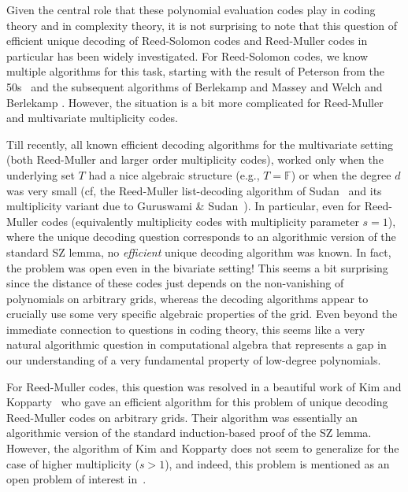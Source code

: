 \documentclass{article}
\def\Field{\mathbb{F}}
\let\F\Field
\begin{document}
	Given the central role that these polynomial evaluation codes play in
	coding theory and in complexity theory, it is not surprising to note
	that this question of efficient unique decoding of Reed-Solomon codes
	and Reed-Muller codes in particular has been widely investigated. For
	Reed-Solomon codes, we know multiple algorithms for this task,
	starting with the result of Peterson from the 50s~\cite{Peterson1960}
	and the subsequent algorithms of Berlekamp and Massey
	\cite{Berlekamp,Massey1969} and Welch and Berlekamp
	\cite{WelchB1986}. However, the situation is a bit more complicated
	for Reed-Muller and multivariate multiplicity codes.
	
	Till recently, all known efficient decoding algorithms for the multivariate setting (both Reed-Muller and larger order multiplicity codes),  worked only when
	the underlying set $T$ had a nice algebraic structure (e.g., $T = \F$)
	or when the degree $d$ was very small (cf, the Reed-Muller
	list-decoding algorithm of Sudan~\cite{Sudan1997} and its multiplicity
	variant due to Guruswami \& Sudan~\cite{GuruswamiS1999}). In particular, even for Reed-Muller codes (equivalently multiplicity codes with multiplicity parameter $s=1$), where the unique decoding question corresponds to an algorithmic version of the standard SZ lemma, no \emph{efficient} unique decoding algorithm was known. In fact, the problem was open even in the bivariate setting! This seems a bit surprising since the distance of these codes just depends on the non-vanishing of polynomials on arbitrary grids, whereas the decoding algorithms appear to crucially use some very specific algebraic properties of the grid. Even beyond the immediate connection to questions in coding theory, this seems like a very natural algorithmic question in computational algebra that represents a gap in our understanding of a very fundamental property of low-degree polynomials.  
	
	For Reed-Muller codes, this question was resolved in a beautiful work of Kim and Kopparty~\cite{KimK2017} who gave an efficient algorithm for this problem of unique decoding Reed-Muller codes on arbitrary grids. Their algorithm was essentially an algorithmic version of the standard induction-based proof of the SZ lemma. However, the algorithm of Kim and Kopparty does not seem to generalize for the case of higher multiplicity ($s > 1$), and indeed, this problem is mentioned as an open problem of interest in~\cite{KimK2017}. 
	
\end{document}
